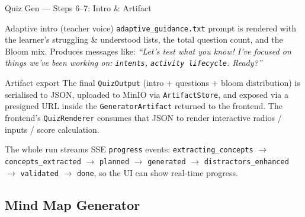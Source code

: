 \documentclass[aspectratio=169, 10pt]{beamer}
\begin{document}
\begin{frame}{Quiz Gen --- Steps 6--7: Intro \& Artifact}
  \scriptsize
  \begin{block}{Adaptive intro (teacher voice)}
    \texttt{adaptive\_guidance.txt} prompt is rendered with the
    learner's struggling \& understood lists, the total question count,
    and the Bloom mix. Produces messages like:
    \emph{``Let's test what you know! I've focused on things we've been
    working on: \texttt{intents}, \texttt{activity lifecycle}. Ready?''}
  \end{block}

  \begin{block}{Artifact export}
    The final \texttt{QuizOutput} (intro + questions + bloom
    distribution) is serialised to JSON, uploaded to MinIO via
    \texttt{ArtifactStore}, and exposed via a presigned URL inside the
    \texttt{GeneratorArtifact} returned to the frontend. The frontend's
    \texttt{QuizRenderer} consumes that JSON to render interactive
    radios / inputs / score calculation.
  \end{block}

  \scriptsize
  The whole run streams SSE \texttt{progress} events:
  \texttt{extracting\_concepts} $\to$ \texttt{concepts\_extracted} $\to$
  \texttt{planned} $\to$ \texttt{generated} $\to$
  \texttt{distractors\_enhanced} $\to$ \texttt{validated} $\to$
  \texttt{done}, so the UI can show real-time progress.
\end{frame}

\subsection*{Mind Map Generator}
\end{document}

